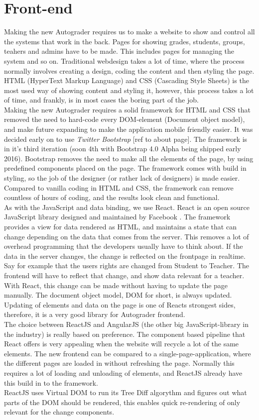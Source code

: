 \section{Front-end}
Making the new Autograder requires us to make a website to show and control all the systems that work in the back. Pages for showing grades, students, groups, teahers and admins have to be made. This includes pages for managing the system and so on. Traditional webdesign takes a lot of time, where the process normally involves creating a design, coding the content and then styling the page. HTML (HyperText Markup Language) and CSS (Cascading Style Sheets) is the most used way of showing content and styling it, however, this process takes a lot of time, and frankly, is in most cases the boring part of the job.
\\Making the new Autograder requires a solid framework for HTML and CSS that removed the need to hard-code every DOM-element (Document object model), and make future expanding to make the application mobile friendly easier. It was decided early on to use \textit{Twitter Bootstrap} [ref to about page]. The framework is in it's third iteration (soon 4th with Bootstrap 4.0 Alpha being shipped early 2016). Bootstrap removes the need to make all the elements of the page, by using predefined components placed on the page. The framework comes with build in styling, so the job of the designer (or rather lack of designers) is made easier. Compared to vanilla coding in HTML and CSS, the framework can remove countless of hours of coding, and the results look clean and functional. \\As with the JavaScript and data binding, we use React. React is an open source JavaScript library designed and maintained by Facebook . The framework provides a view for data rendered as HTML, and maintains a state that can change depending on the data that comes from the server. This removes a lot of overhead programming that the developers usually have to think about. If the data in the server changes, the change is reflected on the frontpage in realtime. Say for example that the users rights are changed from Student to Teacher. The frontend will have to reflect that change, and show data relevant for a teacher. With React, this change can be made without having to update the page manually. The document object model, DOM for short, is always updated. Updating of elements and data on the page is one of Reacts strongest sides, therefore, it is a very good library for Autograder frontend. \\The choice between ReactJS and AngularJS (the other big JavaScript-library in the industry) is really based on preference. The component based pipeline that React offers is very appealing when the website will recycle a lot of the same elements. The new frontend can be compared to a single-page-application, where the different pages are loaded in without refreshing the page. Normally this requires a lot of loading and unloading of elements, and ReactJS already have this build in to the framework. \\ReactJS uses Virtual DOM to run its Tree Diff algorythm and figures out what parts of the DOM should be rendered, this enables quick re-rendering of only relevant for the change components.

